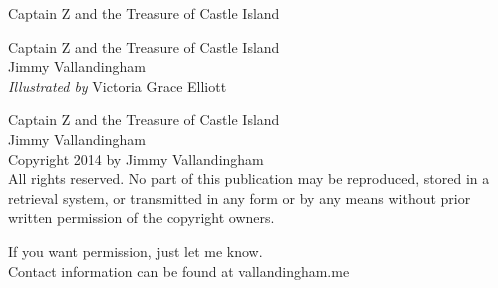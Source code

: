 \documentclass[12pt]{extbook}
\newcommand\blankpage{%
    \null
    \thispagestyle{empty}%
    \addtocounter{page}{-1}%
    \newpage}
\begin{document}



  \pagestyle{empty}
  \vspace*{\fill}
  \begin{center}
  \huge{Captain Z and the Treasure of Castle Island}\\[0.5cm]
  \end{center}
  \vspace*{\fill}

  \begin{titlepage}
    \vspace*{\fill}
    \begin{center}
      \huge{Captain Z and the Treasure of Castle Island}\\[0.5cm]
      \large {Jimmy Vallandingham}\\[0.4cm]
      \large {\textit{Illustrated by} Victoria Grace Elliott}\\[0.4cm]
    \end{center}
    \vspace*{\fill}
  \end{titlepage}
  
  \begingroup
  \footnotesize
  \parindent 0pt
  \parskip \baselineskip
  \vfill
  Captain Z and the Treasure of Castle Island \\
  Jimmy Vallandingham \\


  Copyright \textcopyright{} 2014 by Jimmy Vallandingham \\
  
  All rights reserved. No part of this publication may be reproduced, stored in a retrieval system, or transmitted in any form or by any means without prior written permission of the copyright owners. 
  
  If you want permission, just let me know.\\
  Contact information can be found at vallandingham.me
\end{document}
